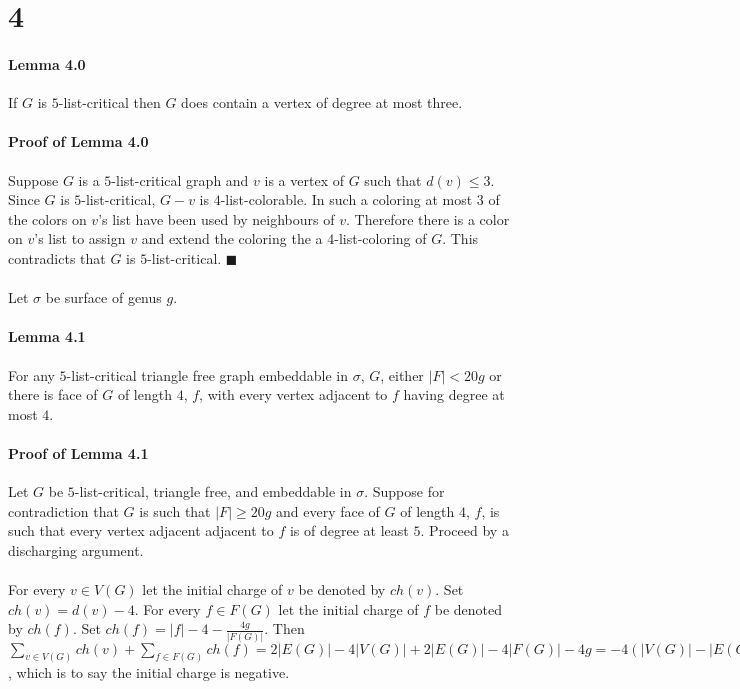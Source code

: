 \documentclass[letterpaper,12pt,oneside,onecolumn]{report}
\begin{document}
\section*{4}
\paragraph{Lemma 4.0}
If $G$ is $5$-list-critical then $G$ does contain a vertex of degree at most three.
\paragraph{Proof of Lemma 4.0}
Suppose $G$ is a $5$-list-critical graph and $v$ is a vertex of $G$ such that $d(v) \leq 3$. Since $G$ is $5$-list-critical, $G-v$ is $4$-list-colorable. In such a coloring at most $3$ of the colors on $v$'s list have been used by neighbours of $v$. Therefore there is a color on $v$'s list to assign $v$ and extend the coloring the a $4$-list-coloring of $G$. This contradicts that $G$ is $5$-list-critical. $\blacksquare$
\paragraph{}
Let $\sigma$ be surface of genus $g$.
\paragraph{Lemma 4.1}
For any $5$-list-critical triangle free graph embeddable in $\sigma$, $G$, either $|F| < 20g$ or there is face of $G$ of length $4$, $f$, with every vertex adjacent to $f$ having degree at most $4$. 
\paragraph{Proof of Lemma 4.1}
Let $G$ be $5$-list-critical, triangle free, and embeddable in $\sigma$. Suppose for contradiction that $G$ is such that $|F| \geq 20g$ and every face of $G$ of length $4$, $f$, is such that every vertex adjacent adjacent to $f$ is of degree at least $5$. Proceed by a discharging argument.
\paragraph{}
For every $v \in V(G)$ let the initial charge of $v$ be denoted by $ch(v)$. Set $ch(v) = d(v) - 4$. For every $f \in F(G)$ let the initial charge of $f$ be denoted by $ch(f)$. Set $ch(f) = |f| - 4 -\frac{4g}{|F(G)|}$. Then $\sum_{v \in V(G)} ch(v) + \sum_{f \in F(G)} ch(f) = 2|E(G)| - 4|V(G)| + 2|E(G)| - 4|F(G)| -4g = -4(|V(G)| - |E(G)| - |F(G)| + g) = -4(2-g + g) = -8$, which is to say the initial charge is negative.
\end{document}

